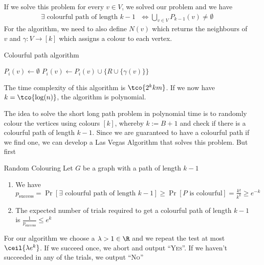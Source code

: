 If we solve this problem for every $v \in V$, we solved our problem and we have
\begin{align*}
    \exists \text{ colourful path of length $k - 1$ } \Longleftrightarrow \bigcup_{v \in V} P_{k - 1}(v) \neq \emptyset
\end{align*}
For the algorithm, we need to also define $N(v)$ which returns the neighbours of $v$ and $\gamma: V \rightarrow [k]$ which assigns a colour to each vertex.

\begin{algorithm}
    \caption{Colourful path algorithm}
    \begin{algorithmic}[1]
                \State $P_i(v) \gets \emptyset$
                        \State $P_i(v) \gets P_i(v) \cup \{R \cup \{\gamma(v)\}\}$
                    \EndFor
                \EndFor
            \EndFor
        \EndProcedure
    \end{algorithmic}
\end{algorithm}
The time complexity of this algorithm is $\tco{2^k km}$. If we now have $k = \tco{\log(n)}$, the algorithm is polynomial.



The idea to solve the short long path problem in polynomial time is to randomly colour the vertices using colours $[k]$, whereby $k := B + 1$ and check if there is a colourful path of length $k - 1$.
Since we are guaranteed to have a colourful path if we find one, we can develop a Las Vegas Algorithm that solves this problem. But first
\begin{theorem}[]{Random Colouring}
    Let $G$ be a graph with a path of length $k - 1$
    \begin{enumerate}[label=(\arabic*)]
        \item We have $p_{\text{success}} = \Pr[\exists \text{ colourful path of length } k - 1] \geq \Pr[P \text{ is colourful}] = \frac{k!}{k^k} \geq e^{-k}$
        \item The expected number of trials required to get a colourful path of length $k - 1$ is $\frac{1}{p_{\text{success}}} \leq e^k$
    \end{enumerate}
\end{theorem}
For our algorithm we choose a $\lambda > 1 \in \R$ and we repeat the test at most $\ceil{\lambda e^k}$. If we succeed once, we abort and output ``\textsc{Yes}''. If we haven't succeeded in any of the trials, we output ``\textsc{No}''


